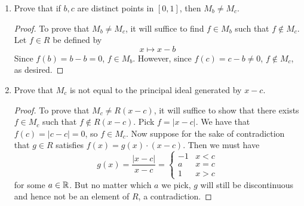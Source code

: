 \documentclass[../psets.tex]{subfiles}
\begin{document}
\begin{enumerate}
\begin{enumerate}[label={\textbf{(\alph*)}}]
\begin{proof}
            \begin{equation*}
                h = \sum_{c\in K}g_cf_c
            \end{equation*}
            Since $M$ is an ideal of $R$, each $f_c\in M$, and each $g_c\in R$, it follows from its definition that $h\in M$. We now show that $h$ is positive on $[0,1]$. Let $x\in[0,1]$ be arbitrary. Since $\mathcal{G}'$ covers $[0,1]$, $x\in G_c$ for some $c\in K$. It follows by the above that both $f_c(x),g_c(x)>0$; hence, $(f_cg_c)(x)>0$. This combined with the fact that every $f_cg_c:[0,1]\to\Rg$ by definition implies that $h(x)>0$, as desired.\par
            It follows that $h\in M$ is a unit with inverse $1/h\in M$ (multiply $h\in M$ by $1/h^2\in R$). Thus, by Proposition 9(1), $M=R$. In particular, $M\not\subsetneq R$, so $M$ is not a maximal ideal, a contradiction.
        \end{proof}
        \item Prove that if $b,c$ are distinct points in $[0,1]$, then $M_b\neq M_c$.
        \begin{proof}
            To prove that $M_b\neq M_c$, it will suffice to find $f\in M_b$ such that $f\notin M_c$. Let $f\in R$ be defined by
            \begin{equation*}
                x \mapsto x-b
            \end{equation*}
            Since $f(b)=b-b=0$, $f\in M_b$. However, since $f(c)=c-b\neq 0$, $f\notin M_c$, as desired.
        \end{proof}
        \item Prove that $M_c$ is not equal to the principal ideal generated by $x-c$.
        \begin{proof}
            To prove that $M_c\neq R(x-c)$, it will suffice to show that there exists $f\in M_c$ such that $f\notin R(x-c)$. Pick $f=|x-c|$. We have that $f(c)=|c-c|=0$, so $f\in M_c$. Now suppose for the sake of contradiction that $g\in R$ satisfies $f(x)=g(x)\cdot(x-c)$. Then we must have
            \begin{equation*}
                g(x) = \frac{|x-c|}{x-c} =
                \begin{cases}
                    -1 & x<c\\
                    a & x=c\\
                    1 & x>c
                \end{cases}
            \end{equation*}
            for some $a\in\mathbb{R}$. But no matter which $a$ we pick, $g$ will still be discontinuous and hence not be an element of $R$, a contradiction.

\end{proof}
\end{enumerate}
\end{enumerate}
\end{document}
